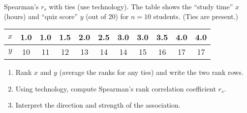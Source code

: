 \documentclass[11pt]{article}
\def\textbf#1{#1}%
\newcounter{question}
\begin{document}
\begin{question}
\textbf{Spearman’s $r_s$ with ties (use technology).}
The table shows the “study time” $x$ (hours) and “quiz score” $y$ (out of 20) for $n=10$ students. (Ties are present.)
\begin{center}
\begin{tabular}{c|cccccccccc}
$x$ & 1.0 & 1.0 & 1.5 & 2.0 & 2.5 & 3.0 & 3.0 & 3.5 & 4.0 & 4.0\\\hline
$y$ & 10  & 11  & 12  & 13  & 14  & 14  & 15  & 16  & 17  & 17
\end{tabular}
\end{center}
\begin{enumerate}
  \item Rank $x$ and $y$ (average the ranks for any ties) and write the two rank rows.
  \item Using technology, compute Spearman’s rank correlation coefficient $r_s$.
  \item Interpret the direction and strength of the association.
\end{enumerate}
\begin{center}
\end{center}
\end{question}
\end{document}
